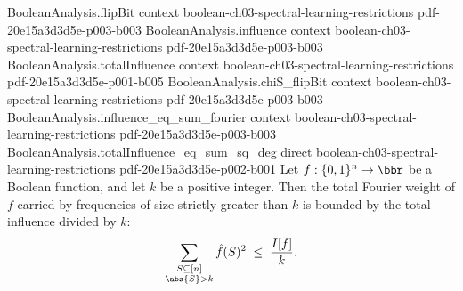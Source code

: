 \begin{lemma}
  {BooleanAnalysis.flipBit}
  {context}
  {boolean-ch03-spectral-learning-restrictions}
  {pdf-20e15a3d3d5e-p003-b003}
\proofstep
  {BooleanAnalysis.influence}
  {context}
  {boolean-ch03-spectral-learning-restrictions}
  {pdf-20e15a3d3d5e-p003-b003}
\proofstep
  {BooleanAnalysis.totalInfluence}
  {context}
  {boolean-ch03-spectral-learning-restrictions}
  {pdf-20e15a3d3d5e-p001-b005}
\proofstep
  {BooleanAnalysis.chiS_flipBit}
  {context}
  {boolean-ch03-spectral-learning-restrictions}
  {pdf-20e15a3d3d5e-p003-b003}
\proofstep
  {BooleanAnalysis.influence_eq_sum_fourier}
  {context}
  {boolean-ch03-spectral-learning-restrictions}
  {pdf-20e15a3d3d5e-p003-b003}
\proofstep
  {BooleanAnalysis.totalInfluence_eq_sum_sq_deg}
  {direct}
  {boolean-ch03-spectral-learning-restrictions}
  {pdf-20e15a3d3d5e-p002-b001}
Let $f : \{0,1\}^n \to \bbr$ be a Boolean function, and let $k$ be a positive integer.
Then the total Fourier weight of $f$ carried by frequencies of size strictly greater
than $k$ is bounded by the total influence divided by $k$:
\[
  \sum_{\substack{S \subseteq [n] \\ \abs{S} > k}} \hat f(S)^2 \;\le\; \frac{I[f]}{k}.
\]
\end{lemma}

